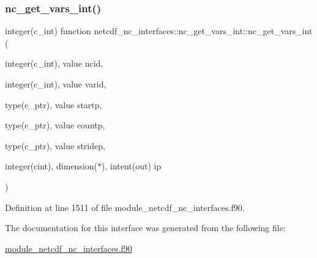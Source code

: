 \subsubsection{\texorpdfstring{nc\+\_\+get\+\_\+vars\+\_\+int()}{nc\_get\_vars\_int()}}
{\footnotesize\ttfamily integer(c\+\_\+int) function netcdf\+\_\+nc\+\_\+interfaces\+::nc\+\_\+get\+\_\+vars\+\_\+int\+::nc\+\_\+get\+\_\+vars\+\_\+int (\begin{DoxyParamCaption}\item[{integer(c\+\_\+int), value}]{ncid,  }\item[{integer(c\+\_\+int), value}]{varid,  }\item[{type(c\+\_\+ptr), value}]{startp,  }\item[{type(c\+\_\+ptr), value}]{countp,  }\item[{type(c\+\_\+ptr), value}]{stridep,  }\item[{integer(cint), dimension($\ast$), intent(out)}]{ip }\end{DoxyParamCaption})}



Definition at line 1511 of file module\+\_\+netcdf\+\_\+nc\+\_\+interfaces.\+f90.



The documentation for this interface was generated from the following file\+:\begin{DoxyCompactItemize}
\item 
\hyperlink{module__netcdf__nc__interfaces_8f90}{module\+\_\+netcdf\+\_\+nc\+\_\+interfaces.\+f90}\end{DoxyCompactItemize}
